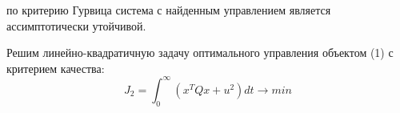 \noindent по критерию Гурвица система с найденным управлением является ассимптотически утойчивой.


Решим линейно-квадратичную задачу оптимального управления объектом (1) с критерием качества:
$$
J_2=\int^{\infty}_0 (x^T Qx+u^2) dt \rightarrow min
$$


